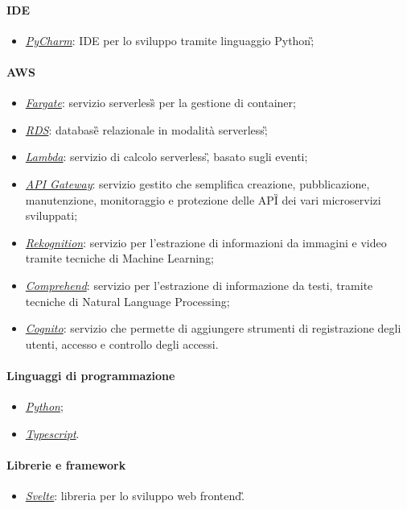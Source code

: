 \paragraph*{IDE}
\begin{itemize}
	\item \href{https://www.jetbrains.com/pycharm/}{\emph{PyCharm}}: IDE per lo sviluppo tramite linguaggio Python\G;
\end{itemize}
\paragraph*{AWS}
\begin{itemize}
	\item \href{https://aws.amazon.com/fargate/}{\emph{Fargate}}: servizio serverless\G{} per la gestione di container;
	\item \href{https://aws.amazon.com/rds/}{\emph{RDS}}: database\G{} relazionale in modalità serverless\G;
	\item \href{https://aws.amazon.com/lambda/}{\emph{Lambda}}: servizio di calcolo serverless\G, basato sugli eventi;
	\item \href{https://aws.amazon.com/fargate/}{\emph{API Gateway}}: servizio gestito che semplifica creazione, pubblicazione, manutenzione, monitoraggio e protezione delle API\G{} dei vari microservizi sviluppati;
	\item \href{https://aws.amazon.com/rekognition/}{\emph{Rekognition}}: servizio per l'estrazione di informazioni da immagini e video tramite tecniche di Machine Learning;
	\item \href{https://aws.amazon.com/comprehend/}{\emph{Comprehend}}: servizio per l'estrazione di informazione da testi, tramite tecniche di Natural Language Processing;
	\item \href{https://aws.amazon.com/cognito/}{\emph{Cognito}}: servizio che permette di aggiungere strumenti di registrazione degli utenti, accesso e controllo degli accessi. 
\end{itemize}
\paragraph*{Linguaggi di programmazione}
\begin{itemize}
	\item \href{https://www.python.org/}{\emph{Python}};
	\item \href{https://www.typescriptlang.org/}{\emph{Typescript}}.
\end{itemize}
\paragraph*{Librerie e framework}
\begin{itemize}
	\item \href{https://svelte.dev/}{\emph{Svelte}}: libreria per lo sviluppo web frontend\G.
\end{itemize}
